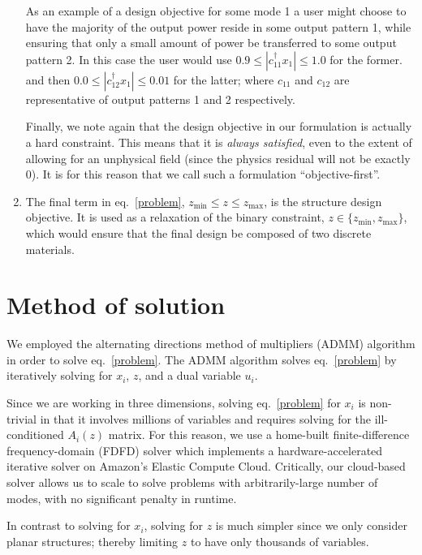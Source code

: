 \documentclass[letterpaper,10pt]{article}
\newcommand{\eq}[1]{eq.~\eqref{#1}}
\newcommand{\T}{^\dagger}
\begin{document}
\begin{enumerate}
    As an example of a design objective for some mode 1 
        a user might choose to have the majority of the output power
        reside in some output pattern 1,
        while ensuring that only a small amount of power 
        be transferred to some output pattern 2.
    In this case the user would use 
        $0.9 \le |c_{11}\T x_1| \le 1.0$ for the former.
        and then $0.0 \le |c_{12}\T x_1| \le 0.01$ for the latter;
        where $c_{11}$ and $c_{12}$ are representative of 
        output patterns 1 and 2 respectively.
        
    Finally, we note again that the design objective in our formulation
        is actually a hard constraint.
    This means that it is \emph{always satisfied}, 
        even to the extent of allowing for an unphysical field 
        (since the physics residual will not be exactly 0).
    It is for this reason that we call such a formulation ``objective-first''.

\item 
    The final term in \eq{problem}, $z_\text{min} \le z \le z_\text{max}$,
        is the structure design objective.
    It is used as a relaxation of the binary constraint,
        $z \in \{z_\text{min}, z_\text{max}\}$,
        which would ensure that the final design be composed 
        of two discrete materials.
\end{enumerate}

\section{Method of solution}
We employed the alternating directions method of multipliers (ADMM) algorithm 
    \cite{admm}
    in order to solve \eq{problem}.
The ADMM algorithm solves \eq{problem} by iteratively solving for 
    $x_i$, $z$, and a dual variable $u_i$.

Since we are working in three dimensions, solving \eq{problem} for $x_i$ 
    is non-trivial in that it involves millions of variables and
    requires solving for the ill-conditioned $A_i(z)$ matrix.
For this reason, we use a home-built
    finite-difference frequency-domain (FDFD) solver which 
    implements a hardware-accelerated iterative solver\cite{wonseok}
    on Amazon's Elastic Compute Cloud.
Critically, our cloud-based solver allows us to scale to solve problems
    with arbitrarily-large number of modes,
    with no significant penalty in runtime.

In contrast to solving for $x_i$, solving for $z$ is much simpler since we
    only consider planar structures;
    thereby limiting $z$ to have only thousands of variables.
\end{document}
